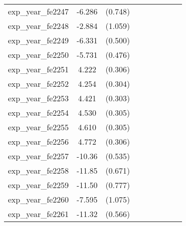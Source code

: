 {\begin{tabular}{l*{4}{cc}}
exp\_year\_fe2247&   -6.286\sym{***}&  (0.748)&                  &         &                  &         &                  &         \\
exp\_year\_fe2248&   -2.884\sym{**} &  (1.059)&                  &         &                  &         &                  &         \\
exp\_year\_fe2249&   -6.331\sym{***}&  (0.500)&                  &         &                  &         &                  &         \\
exp\_year\_fe2250&   -5.731\sym{***}&  (0.476)&                  &         &                  &         &                  &         \\
exp\_year\_fe2251&    4.222\sym{***}&  (0.306)&                  &         &                  &         &                  &         \\
exp\_year\_fe2252&    4.254\sym{***}&  (0.304)&                  &         &                  &         &                  &         \\
exp\_year\_fe2253&    4.421\sym{***}&  (0.303)&                  &         &                  &         &                  &         \\
exp\_year\_fe2254&    4.530\sym{***}&  (0.305)&                  &         &                  &         &                  &         \\
exp\_year\_fe2255&    4.610\sym{***}&  (0.305)&                  &         &                  &         &                  &         \\
exp\_year\_fe2256&    4.772\sym{***}&  (0.306)&                  &         &                  &         &                  &         \\
exp\_year\_fe2257&   -10.36\sym{***}&  (0.535)&                  &         &                  &         &                  &         \\
exp\_year\_fe2258&   -11.85\sym{***}&  (0.671)&                  &         &                  &         &                  &         \\
exp\_year\_fe2259&   -11.50\sym{***}&  (0.777)&                  &         &                  &         &                  &         \\
exp\_year\_fe2260&   -7.595\sym{***}&  (1.075)&                  &         &                  &         &                  &         \\
exp\_year\_fe2261&   -11.32\sym{***}&  (0.566)&                  &         &                  &         &                  &         \\

\end{tabular}}
